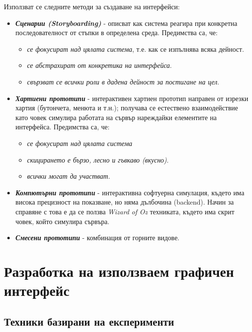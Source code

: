\documentclass[fleqn,12pt]{article}
\begin{document}
Използват се следните методи за създаване на интерфейси:
\begin{itemize}
    \item \textbf{\textit{Сценарии (Storyboarding)}} - описват как система реагира при конкретна последователност от стъпки в определена среда.
    Предимства са, че:
    \begin{itemize}
        \item \textit{се фокусират над цялата система}, т.е. как се изпълнява всяка дейност.
        \item \textit{се абстрахират от конкретика на интерфейса}.
        \item \textit{свързват се всички роли в дадена дейност за постигане на цел}.
    \end{itemize}
    \item \textbf{\textit{Хартиени прототипи}} - интерактивен хартиен прототип направен от изрезки хартия (бутончета, менюта и т.н.);
    получава се естествено взаимодействие като човек симулира работата на сървър нареждайки елементите на интерфейса.
    Предимства са, че:
    \begin{itemize}
        \item \textit{се фокусират над цялата система}
        \item \textit{скицирането е бързо, лесно и гъвкаво (вкусно)}.
        \item \textit{всички могат да участват}.
    \end{itemize}
    \item \textbf{\textit{Компютърни прототипи}} - интерактивна софтуерна симулация, където има висока прецизност на показване, но няма дълбочина (backend).
    Начин за справяне с това е да се ползва \textit{Wizard of Oz} техниката, където има скрит човек, който симулира сървъра.
    \item \textbf{\textit{Смесени прототипи}} - комбинация от горните видове.
\end{itemize}

\section{Разработка на използваем графичен интерфейс}

\subsection{Техники базирани на експерименти}
\end{document}
